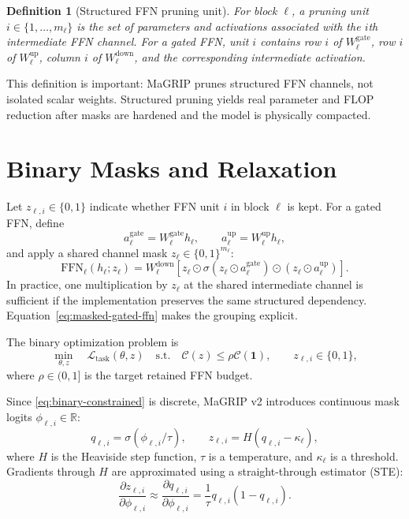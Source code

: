 \documentclass[11pt]{article}
\newtheorem{definition}{Definition}
\newcommand{\R}{\mathbb{R}}
\newcommand{\Loss}{\mathcal{L}}
\newcommand{\Cost}{\mathcal{C}}
\newcommand{\FFN}{\mathrm{FFN}}
\begin{document}
\begin{definition}[Structured FFN pruning unit]
For block $\ell$, a pruning unit $i\in\{1,\dots,m_{\ell}\}$ is the set of parameters and activations associated with the $i$th intermediate FFN channel. For a gated FFN, unit $i$ contains row $i$ of $W_{\ell}^{\mathrm{gate}}$, row $i$ of $W_{\ell}^{\mathrm{up}}$, column $i$ of $W_{\ell}^{\mathrm{down}}$, and the corresponding intermediate activation.
\end{definition}

This definition is important: MaGRIP prunes structured FFN channels, not isolated scalar weights. Structured pruning yields real parameter and FLOP reduction after masks are hardened and the model is physically compacted.

\section{Binary Masks and Relaxation}

Let $z_{\ell,i}\in\{0,1\}$ indicate whether FFN unit $i$ in block $\ell$ is kept. For a gated FFN, define
\begin{equation}
  a_{\ell}^{\mathrm{gate}} = W_{\ell}^{\mathrm{gate}}h_{\ell},
  \qquad
  a_{\ell}^{\mathrm{up}} = W_{\ell}^{\mathrm{up}}h_{\ell},
\end{equation}
and apply a shared channel mask $z_{\ell}\in\{0,1\}^{m_{\ell}}$:
\begin{equation}
  \FFN_{\ell}(h_{\ell}; z_{\ell})
  =
  W_{\ell}^{\mathrm{down}}
  \left[
    z_{\ell}
    \odot
    \sigma\!\left(z_{\ell}\odot a_{\ell}^{\mathrm{gate}}\right)
    \odot
    \left(z_{\ell}\odot a_{\ell}^{\mathrm{up}}\right)
  \right].
  \label{eq:masked-gated-ffn}
\end{equation}
In practice, one multiplication by $z_{\ell}$ at the shared intermediate channel is sufficient if the implementation preserves the same structured dependency. Equation~\eqref{eq:masked-gated-ffn} makes the grouping explicit.

The binary optimization problem is
\begin{equation}
  \min_{\theta, z}
  \quad
  \Loss_{\mathrm{task}}(\theta,z)
  \quad
  \mathrm{s.t.}
  \quad
  \Cost(z) \leq \rho \Cost(\bm{1}),
  \qquad
  z_{\ell,i}\in\{0,1\},
  \label{eq:binary-constrained}
\end{equation}
where $\rho\in(0,1]$ is the target retained FFN budget.

Since \eqref{eq:binary-constrained} is discrete, MaGRIP v2 introduces continuous mask logits $\phi_{\ell,i}\in\R$:
\begin{equation}
  q_{\ell,i} = \sigma(\phi_{\ell,i}/\tau),
  \qquad
  z_{\ell,i} = H(q_{\ell,i} - \kappa_{\ell}),
  \label{eq:mask-relaxation}
\end{equation}
where $H$ is the Heaviside step function, $\tau$ is a temperature, and $\kappa_{\ell}$ is a threshold. Gradients through $H$ are approximated using a straight-through estimator (STE):
\begin{equation}
  \frac{\partial z_{\ell,i}}{\partial \phi_{\ell,i}}
  \approx
  \frac{\partial q_{\ell,i}}{\partial \phi_{\ell,i}}
  =
  \frac{1}{\tau}q_{\ell,i}(1-q_{\ell,i}).
\end{equation}
\end{document}
